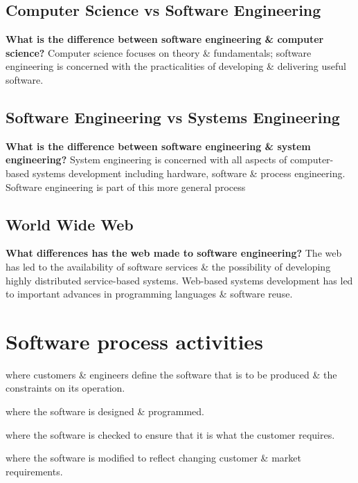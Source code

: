 \documentclass{report}
\begin{document}
\subsection{Computer Science vs Software Engineering}
\noindent\textbf{What is the difference between software engineering \& computer science?}\newline
Computer science focuses on theory \& fundamentals; software engineering is concerned with the practicalities of developing \& delivering useful software.

\subsection{Software Engineering vs Systems Engineering}
\noindent\textbf{What is the difference between software engineering \& system engineering?}\newline
System engineering is concerned with all aspects of computer-based systems development including hardware, software \& process engineering. Software engineering is part of this more general process

\subsection{World Wide Web}
\noindent\textbf{What differences has the web made to software engineering?}\newline
The web has led to the availability of software services \& the possibility of developing highly distributed service-based systems. Web-based systems development has led to important advances in programming languages \& software reuse.

\newpage
\section{Software process activities}
\begin{description}[style=multiline,leftmargin=12em]
  \item [Software specification] where customers \& engineers
define the software that is to be produced \& the constraints on its operation.
  \item [Software development] where the software is designed \& programmed.
  \item [Software validation] where the software is checked to ensure that it is what the customer requires.
  \item [Software evolution] where the software is modified to reflect changing customer \& market requirements.
\end{description}
\end{document}
